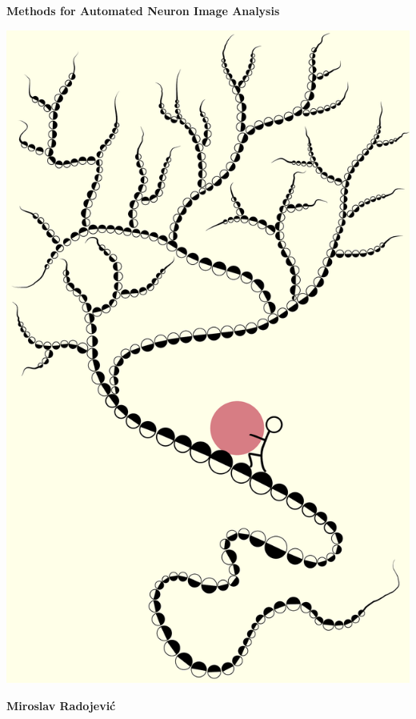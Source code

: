 \documentclass[10pt, oneside]{report}
\begin{document}
	\pagecolor{backgroundColor}

	\thispagestyle{empty}
	\begin{center}
		{\Huge\bf Methods for Automated Neuron Image Analysis\\}%
	\end{center}
	
	\vfill
	
	\begin{center}
		\includegraphics[height=1.0\linewidth]{syziphus}
	\end{center}
	
	\vfill
	
	\begin{flushright}
		{\huge\bf Miroslav Radojevi\'{c}}
	\end{flushright}
\end{document}
